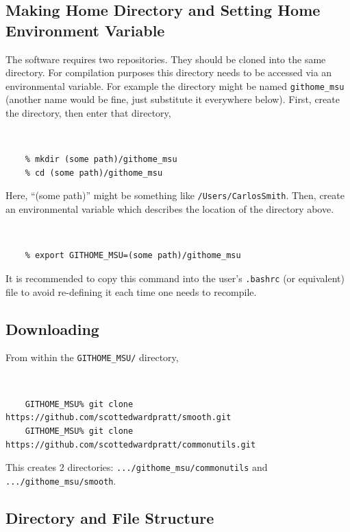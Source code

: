 \documentclass[main.tex]{subfiles}
\begin{document}
\subsection{Making Home Directory and Setting Home Environment Variable}

The software requires two repositories. They should be cloned into the same directory. For compilation purposes this directory needs to be accessed via an environmental variable.  For example the directory might be named {\tt githome\_msu} (another name would be fine, just substitute it everywhere below). First, create the directory, then enter that directory,\\
\vspace{-20pt}
{\tt 
\begin{verbatim}
    % mkdir (some path)/githome_msu
    % cd (some path)/githome_msu
\end{verbatim}
}
Here, ``(some path)'' might be something like {\tt /Users/CarlosSmith}. Then, create an environmental variable which describes the location of the directory above.\\
\vspace{-20pt}
{\tt 
\begin{verbatim}
    % export GITHOME_MSU=(some path)/githome_msu
\end{verbatim}
}
It is recommended to copy this command into the user's {\tt .bashrc} (or equivalent) file to avoid re-defining it each time one needs to recompile.

\subsection{Downloading}\label{sec:Downloading_Compiling}
From within the {\tt GITHOME\_MSU/} directory,\\
\vspace{-20pt}
{\tt 
\begin{verbatim}
    GITHOME_MSU% git clone https://github.com/scottedwardpratt/smooth.git
    GITHOME_MSU% git clone https://github.com/scottedwardpratt/commonutils.git
\end{verbatim}
}

This creates 2 directories: {\tt .../githome\_msu/commonutils} and {\tt .../githome\_msu/smooth}.

\subsection{Directory and File Structure}
\end{document}
